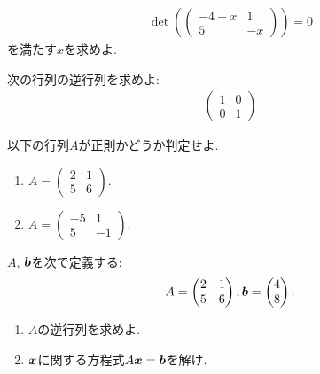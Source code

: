 \begin{quiz}
  \label{quiz:2:2}
  
  \begin{align*}
    \det(
    \begin{pmatrix}
      -4-x&1\\5&-x
    \end{pmatrix})=0
  \end{align*}
  を満たす$x$を求めよ.
\end{quiz}

\begin{quiz}
  次の行列の逆行列を求めよ:
  \begin{align*}
    \begin{pmatrix}
      1&0\\0&1
    \end{pmatrix}
  \end{align*}
\end{quiz}

\begin{quiz}
  \label{quiz:2:reg:1}
  以下の行列$A$が正則かどうか判定せよ.
  \begin{enumerate}
  \item
    $A=\begin{pmatrix}2&1\\5&6\end{pmatrix}$.
  \item
    $A=\begin{pmatrix}-5&1\\5&-1\end{pmatrix}$.
  \end{enumerate}
\end{quiz}

\begin{quiz}
  \label{quiz:2:4}
  $A$, $\boldsymbol{b}$を次で定義する:
  \begin{align*}
    A=\begin{pmatrix}
      2&1\\5&6
    \end{pmatrix},
    \boldsymbol{b}=\begin{pmatrix}
      4\\8
    \end{pmatrix}.   
  \end{align*}
  \begin{enumerate}
  \item $A$の逆行列を求めよ.
  \item $\boldsymbol{x}$に関する方程式$A\boldsymbol{x}=\boldsymbol{b}$を解け.
  \end{enumerate}
\end{quiz}

